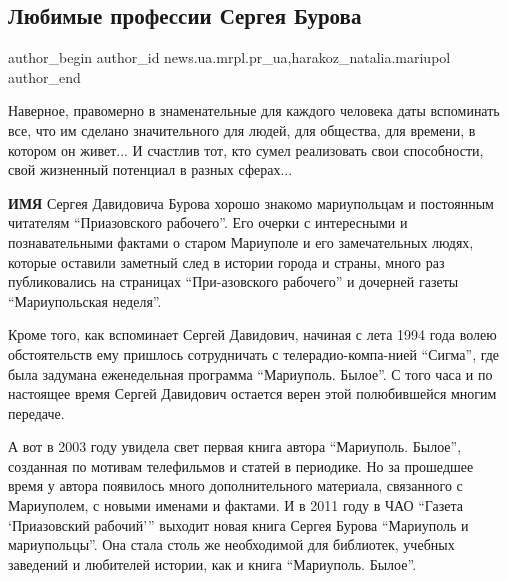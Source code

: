  
 
 
 
 
 
\subsection{Любимые профессии Сергея Бурова}
\label{sec:29_06_2012.stz.news.ua.mrpl.pr_ua.1.ljubimye_professii_sergeja_burova}
 
\ifcmt
 author_begin
   author_id news.ua.mrpl.pr_ua,harakoz_natalia.mariupol
 author_end
\fi

\begin{qqquote}
Наверное, правомерно в знаменательные для каждого человека даты вспоминать
все, что им сделано значительного для людей, для общества, для времени, в
котором он живет... И счастлив тот, кто сумел реализовать свои способности,
свой жизненный потенциал в разных сферах...
\end{qqquote}

\textbf{ИМЯ} Сергея Давидовича Бурова хорошо знакомо мариупольцам и постоянным
читателям \enquote{Приазовского рабочего}. Его очерки с интересными и
познавательными фактами о старом Мариуполе и его замечательных людях, которые
оставили заметный след в истории города и страны, много раз публиковались на
страницах \enquote{При-азовского рабочего} и дочерней газеты
\enquote{Мариупольская неделя}.

Кроме того, как вспоминает Сергей Давидович, начиная с лета 1994 года волею
обстоятельств ему пришлось сотрудничать с телерадио-компа\hyp{}нией \enquote{Сигма},
где была задумана еженедельная программа \enquote{Мариуполь. Былое}. С того
часа и по настоящее время Сергей Давидович остается верен этой полюбившейся
многим передаче.


А вот в 2003 году увидела свет первая книга автора \enquote{Мариуполь. Былое},
созданная по мотивам телефильмов и статей в периодике. Но за прошедшее время у
автора появилось много дополнительного материала, связанного с Мариуполем, с
новыми именами и фактами. И в 2011 году в ЧАО \enquote{Газета
\enquote{Приазовский рабочий}} выходит новая книга Сергея Бурова
\enquote{Мариуполь и мариупольцы}. Она стала столь же необходимой для
библиотек, учебных заведений и любителей истории, как и книга
\enquote{Мариуполь. Былое}.

